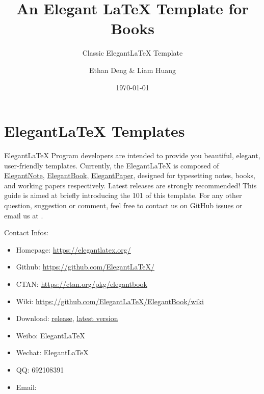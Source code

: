 \documentclass[fancy,blue,11pt]{elegantbook}
\title{An Elegant \LaTeX{} Template for Books}
\subtitle{Classic Elegant\LaTeX{} Template}
\author{Ethan Deng \& Liam Huang}
\institute{Elegant\LaTeX{} Program}
\date{\today}
\begin{document}
\maketitle
\tableofcontents
\clearpage
\thispagestyle{empty}
\mainmatter
\hypersetup{pageanchor=true}

\chapter{Elegant\LaTeX{} Templates}
Elegant\LaTeX{} Program developers are intended to provide you beautiful, elegant, user-friendly templates. Currently, the Elegant\LaTeX{} is composed of \href{https://github.com/ElegantLaTeX/ElegantNote}{ElegantNote}, \href{https://github.com/ElegantLaTeX/ElegantBook}{ElegantBook}, \href{https://github.com/ElegantLaTeX/ElegantPaper}{ElegantPaper}, designed for typesetting notes, books, and working papers respectively. Latest releases are strongly recommended! This guide is aimed at briefly introducing the 101 of this template. For any other question, suggestion or comment, feel free to contact us on GitHub \href{https://github.com/ElegantLaTeX/ElegantBook/issues}{issues} or email us at .

Contact Infos:
\begin{itemize}
	\item Homepage: \href{https://elegantlatex.org/}{https://elegantlatex.org/}
	\item Github: \href{https://github.com/ElegantLaTeX/}{https://github.com/ElegantLaTeX/}
	\item CTAN: \href{https://ctan.org/pkg/elegantbook}{https://ctan.org/pkg/elegantbook}
	\item Wiki: \href{https://github.com/ElegantLaTeX/ElegantBook/wiki}{https://github.com/ElegantLaTeX/ElegantBook/wiki}
	\item Download: \href{https://github.com/ElegantLaTeX/ElegantBook/releases}{release}, \href{https://github.com/ElegantLaTeX/ElegantBook/archive/master.zip}{latest version}
	\item Weibo: ElegantLaTeX
	\item Wechat: ElegantLaTeX
	\item QQ: 692108391
	\item Email: 
\end{itemize}
\end{document}
